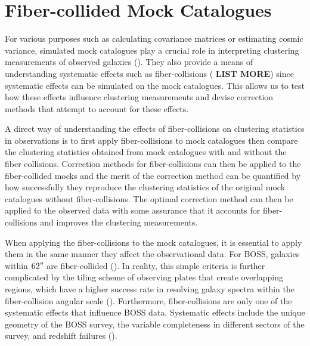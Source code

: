 \documentclass{emulateapj}
\begin{document}
\section{Fiber-collided Mock Catalogues} \label{sec:catalog}
For various purposes such as calculating covariance matrices or estimating cosmic variance, simulated mock catalogues play a crucial role in interpreting clustering measurements of observed galaxies (\citealt{Scoccimarro:2002aa, Anderson:2012aa, Manera:2013aa}). They also provide a means of understanding systematic effects such as fiber-collisions (\citealt{Guo:2012aa, Manera:2013aa} {\bf LIST MORE}) since systematic effects can be simulated on the mock catalogues. This allows us to test how these effects influence clustering measurements and devise correction methods that attempt to account for these effects.

A direct way of understanding the effects of fiber-collisions on clustering statistics in observations is to first apply fiber-collisions to mock catalogues then compare the clustering statistics obtained from mock catalogues with and without the fiber collisions. Correction methods for fiber-collisions can then be applied to the fiber-collided mocks and the merit of the correction method can be quantified by how successfully they reproduce the clustering statistics of the original mock catalogues without fiber-collisions. The optimal correction method can then be applied to the observed data with some assurance that it accounts for fiber-collisions and improves the clustering measurements. 

When applying the fiber-collisions to the mock catalogues, it is essential to apply them in the same manner they affect the observational data. For BOSS, galaxies within $62"$ are fiber-collided (\citealt{Anderson:2012aa}). In reality, this simple criteria is further complicated by the tiling scheme of observing plates that create overlapping regions, which have a higher success rate in resolving galaxy spectra within the fiber-collision angular scale (\citealt{Guo:2012aa}). Furthermore, fiber-collisions are only one of the systematic effects that influence BOSS data. Systematic effects include the unique geometry of the BOSS survey, the variable completeness in different sectors of the survey, and redshift failures (\citealt{Anderson:2012aa}). 
\end{document}
